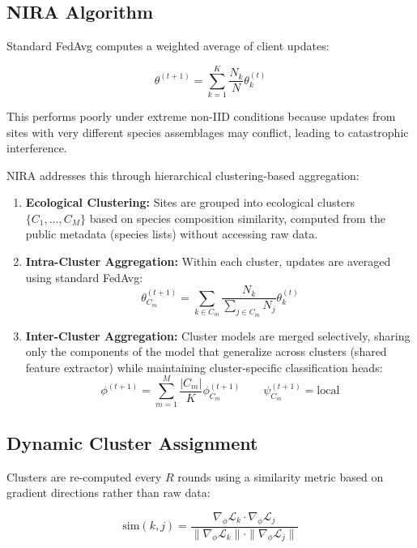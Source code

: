 \documentclass[11pt,a4paper]{article}
\begin{document}
\subsection{NIRA Algorithm}

Standard FedAvg computes a weighted average of client updates:

\begin{equation}
    \theta^{(t+1)} = \sum_{k=1}^{K} \frac{N_k}{N} \theta_k^{(t)}
\end{equation}

This performs poorly under extreme non-IID conditions because updates from sites with very different species assemblages may conflict, leading to catastrophic interference.

NIRA addresses this through hierarchical clustering-based aggregation:

\begin{enumerate}[leftmargin=*]
    \item \textbf{Ecological Clustering:} Sites are grouped into ecological clusters $\{C_1, \ldots, C_M\}$ based on species composition similarity, computed from the public metadata (species lists) without accessing raw data.
    \item \textbf{Intra-Cluster Aggregation:} Within each cluster, updates are averaged using standard FedAvg:
    \begin{equation}
        \theta_{C_m}^{(t+1)} = \sum_{k \in C_m} \frac{N_k}{\sum_{j \in C_m} N_j} \theta_k^{(t)}
    \end{equation}
    \item \textbf{Inter-Cluster Aggregation:} Cluster models are merged selectively, sharing only the components of the model that generalize across clusters (shared feature extractor) while maintaining cluster-specific classification heads:
    \begin{equation}
        \phi^{(t+1)} = \sum_{m=1}^{M} \frac{|C_m|}{K} \phi_{C_m}^{(t+1)} \qquad \psi_{C_m}^{(t+1)} = \text{local}
    \end{equation}
\end{enumerate}

\subsection{Dynamic Cluster Assignment}

Clusters are re-computed every $R$ rounds using a similarity metric based on gradient directions rather than raw data:

\begin{equation}
    \text{sim}(k, j) = \frac{\nabla_\phi \mathcal{L}_k \cdot \nabla_\phi \mathcal{L}_j}{\|\nabla_\phi \mathcal{L}_k\| \cdot \|\nabla_\phi \mathcal{L}_j\|}
\end{equation}
\end{document}
